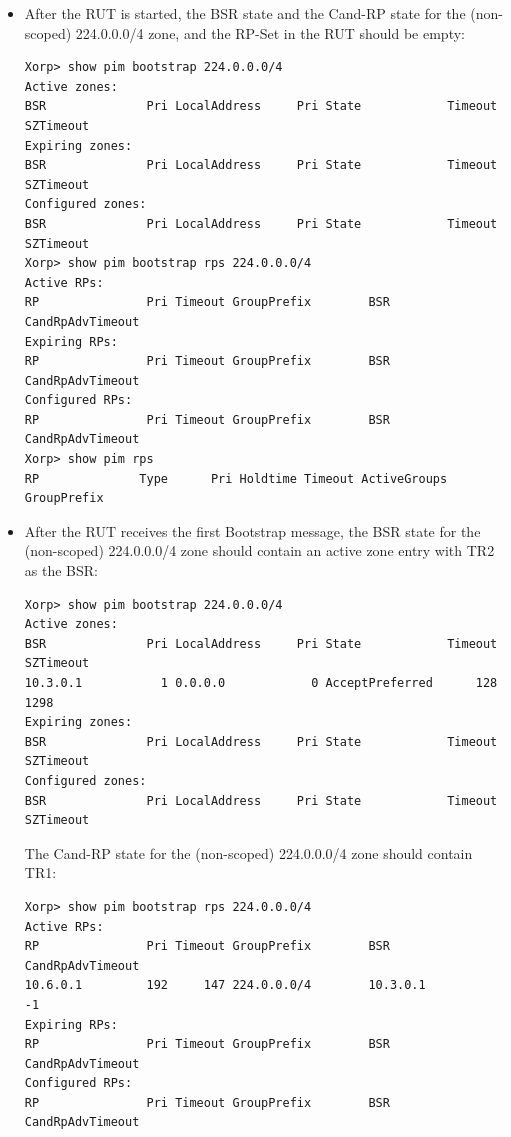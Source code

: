 \documentclass[11pt]{report}
\begin{document}

\begin{itemize}

  \item After the RUT is started, the BSR state and the Cand-RP state for the
 (non-scoped) 224.0.0.0/4 zone, and the RP-Set in the RUT should be empty:

\begin{verbatim}
Xorp> show pim bootstrap 224.0.0.0/4
Active zones:
BSR              Pri LocalAddress     Pri State            Timeout SZTimeout
Expiring zones:
BSR              Pri LocalAddress     Pri State            Timeout SZTimeout
Configured zones:
BSR              Pri LocalAddress     Pri State            Timeout SZTimeout
Xorp> show pim bootstrap rps 224.0.0.0/4
Active RPs:
RP               Pri Timeout GroupPrefix        BSR         CandRpAdvTimeout
Expiring RPs:
RP               Pri Timeout GroupPrefix        BSR         CandRpAdvTimeout
Configured RPs:
RP               Pri Timeout GroupPrefix        BSR         CandRpAdvTimeout
Xorp> show pim rps 
RP              Type      Pri Holdtime Timeout ActiveGroups GroupPrefix       
\end{verbatim}

  \item After the RUT receives the first Bootstrap message, the BSR state for
  the (non-scoped) 224.0.0.0/4 zone should contain an active zone entry with
  TR2 as the BSR:

\begin{verbatim}
Xorp> show pim bootstrap 224.0.0.0/4
Active zones:
BSR              Pri LocalAddress     Pri State            Timeout SZTimeout
10.3.0.1           1 0.0.0.0            0 AcceptPreferred      128      1298
Expiring zones:
BSR              Pri LocalAddress     Pri State            Timeout SZTimeout
Configured zones:
BSR              Pri LocalAddress     Pri State            Timeout SZTimeout
\end{verbatim}

  The Cand-RP state for the (non-scoped) 224.0.0.0/4 zone should contain TR1:

\begin{verbatim}
Xorp> show pim bootstrap rps 224.0.0.0/4
Active RPs:
RP               Pri Timeout GroupPrefix        BSR         CandRpAdvTimeout
10.6.0.1         192     147 224.0.0.0/4        10.3.0.1                  -1
Expiring RPs:
RP               Pri Timeout GroupPrefix        BSR         CandRpAdvTimeout
Configured RPs:
RP               Pri Timeout GroupPrefix        BSR         CandRpAdvTimeout
\end{verbatim}


\end{itemize}
\end{document}
